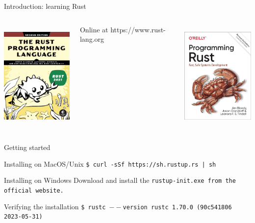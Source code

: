     \begin{frame}{Introduction: learning Rust}
        \begin{columns}[t, onlytextwidth]
            \centering
            \includegraphics[height=5.5cm, keepaspectratio]{images/rust-book.jpg}

            \small Online at https://www.rust-lang.org

            \centering
            \includegraphics[height=5.5cm, keepaspectratio]{images/programming-rust.jpg}
        \end{columns}
    \end{frame}

    \begin{frame}[containsverbatim]{Getting started}
        \small
        \begin{block}{Installing on MacOS/Unix}
            \tt{\$ curl -sSf https://sh.rustup.rs | sh}
        \end{block}

        \begin{block}{Installing on Windows}
            Download and install the \tt{rustup-init.exe} from the official website. 
        \end{block}

        \begin{alertblock}{Verifying the installation}
            \tt{\$ rustc $--$version}
            \tt{rustc 1.70.0 (90c541806 2023-05-31)}
        \end{alertblock}
    \end{frame}

